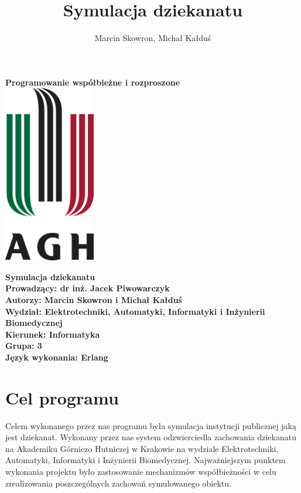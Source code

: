 \documentclass[a4paper,12pt]{article}
\title{Symulacja dziekanatu}
\author{Marcin Skowron, Michał Kałduś}
\begin{document}
\begin{titlepage}
    \centering
    \vfill
    {\bfseries\LARGE
        Programowanie współbieżne i rozproszone\\

    }    
    \vfill
    \includegraphics[width=4cm]{agh.jpg} 
    \vfill
    
     {\bfseries\large
     	{\Huge Symulacja dziekanatu} \\ 
     Prowadzący: dr inż. Jacek Piwowarczyk \\
     Autorzy: Marcin Skowron i Michał Kałduś\\
     Wydział: Elektrotechniki, Automatyki, Informatyki i Inżynierii Biomedycznej\\
     Kierunek: Informatyka\\
     Grupa: 3\\
     Język wykonania: Erlang
     
    }  
    \vfill
\end{titlepage}


\tableofcontents

\newpage


\section{Cel programu}
	
Celem wykonanego przez nas programu była symulacja instytucji publicznej jaką jest dziekanat. Wykonany przez nas system odzwierciedla zachowania dziekanatu na Akademiku Górniczo Hutniczej w Krakowie na wydziale Elektrotechniki, Automatyki, Informatyki i Inżynierii Biomedycznej. Najważniejszym punktem wykonania projektu było zastosowanie mechanizmów współbieżności w celu zrealizowania poszczególnych zachowań symulowanego obiektu.
\end{document}
